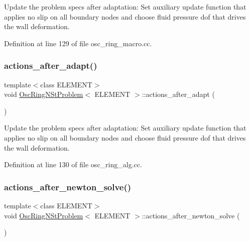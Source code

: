 Update the problem specs after adaptation\+: Set auxiliary update function that applies no slip on all boundary nodes and choose fluid pressure dof that drives the wall deformation. 



Definition at line 129 of file osc\+\_\+ring\+\_\+macro.\+cc.

\mbox{\label{classOscRingNStProblem_a2dd1cb9b211f2cbd2ea9aea625685bcb}} 
\subsubsection{\texorpdfstring{actions\+\_\+after\+\_\+adapt()}{actions\_after\_adapt()}\hspace{0.1cm}{\footnotesize\ttfamily [2/2]}}
{\footnotesize\ttfamily template$<$class E\+L\+E\+M\+E\+NT$>$ \\
void \hyperlink{classOscRingNStProblem}{Osc\+Ring\+N\+St\+Problem}$<$ E\+L\+E\+M\+E\+NT $>$\+::actions\+\_\+after\+\_\+adapt (\begin{DoxyParamCaption}{ }\end{DoxyParamCaption})\hspace{0.3cm}{\ttfamily [inline]}}



Update the problem specs after adaptation\+: Set auxiliary update function that applies no slip on all boundary nodes and choose fluid pressure dof that drives the wall deformation. 



Definition at line 130 of file osc\+\_\+ring\+\_\+alg.\+cc.

\mbox{\label{classOscRingNStProblem_a6e4be6a46ab263941b76ab4e6706f63a}} 
\subsubsection{\texorpdfstring{actions\+\_\+after\+\_\+newton\+\_\+solve()}{actions\_after\_newton\_solve()}\hspace{0.1cm}{\footnotesize\ttfamily [1/2]}}
{\footnotesize\ttfamily template$<$class E\+L\+E\+M\+E\+NT$>$ \\
void \hyperlink{classOscRingNStProblem}{Osc\+Ring\+N\+St\+Problem}$<$ E\+L\+E\+M\+E\+NT $>$\+::actions\+\_\+after\+\_\+newton\+\_\+solve (\begin{DoxyParamCaption}{ }\end{DoxyParamCaption})\hspace{0.3cm}{\ttfamily [inline]}}



